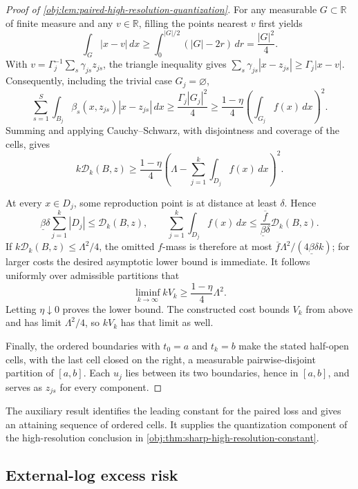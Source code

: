 \documentclass[11pt]{article}
\begin{document}
\begin{proof}[Proof of \cref{obj:lem:paired-high-resolution-quantization}]
For any measurable \(G\subset\mathbb R\) of finite measure and any \(v\in\mathbb R\), filling the points nearest \(v\) first yields
\[
\int_G|x-v|\,dx
\ge\int_0^{|G|/2}(|G|-2r)\,dr
=\frac{|G|^2}{4}.
\]
With \(v=\Gamma_j^{-1}\sum_s\gamma_{js}z_{js}\), the triangle inequality gives
\(\sum_s\gamma_{js}|x-z_{js}|\ge\Gamma_j|x-v|\).
Consequently, including the trivial case \(G_j=\varnothing\),
\[
\sum_{s=1}^S\int_{B_j}\beta_s(x,z_{js})|x-z_{js}|\,dx
\ge\frac{\Gamma_j|G_j|^2}{4}
\ge\frac{1-\eta}{4}\left(\int_{G_j}f(x)\,dx\right)^2.
\]
Summing and applying Cauchy--Schwarz, with disjointness and coverage of the cells, gives
\[
k\mathcal D_k(B,z)
\ge\frac{1-\eta}{4}
\left(\Lambda-\sum_{j=1}^k\int_{D_j}f(x)\,dx\right)^2.
\]

At every \(x\in D_j\), some reproduction point is at distance at least \(\delta\). Hence
\[
\underline\beta\delta\sum_{j=1}^k|D_j|
\le\mathcal D_k(B,z),
\qquad
\sum_{j=1}^k\int_{D_j}f(x)\,dx
\le\frac{\overline f}{\underline\beta\delta}\mathcal D_k(B,z).
\]
If \(k\mathcal D_k(B,z)\le\Lambda^2/4\), the omitted \(f\)-mass is therefore at most
\(\overline f\Lambda^2/(4\underline\beta\delta k)\); for larger costs the desired asymptotic lower bound is immediate. It follows uniformly over admissible partitions that
\[
\liminf_{k\to\infty}kV_k\ge\frac{1-\eta}{4}\Lambda^2.
\]
Letting \(\eta\downarrow0\) proves the lower bound. The constructed cost bounds \(V_k\) from above and has limit \(\Lambda^2/4\), so \(kV_k\) has that limit as well.

Finally, the ordered boundaries with \(t_0=a\) and \(t_k=b\) make the stated half-open cells, with the last cell closed on the right, a measurable pairwise-disjoint partition of \([a,b]\). Each \(u_j\) lies between its two boundaries, hence in \([a,b]\), and serves as \(z_{js}\) for every component.
\end{proof}

The auxiliary result identifies the leading constant for the paired loss and gives an attaining sequence of ordered cells. It supplies the quantization component of the high-resolution conclusion in \cref{obj:thm:sharp-high-resolution-constant}.

\subsection{External-log excess risk}
\end{document}
